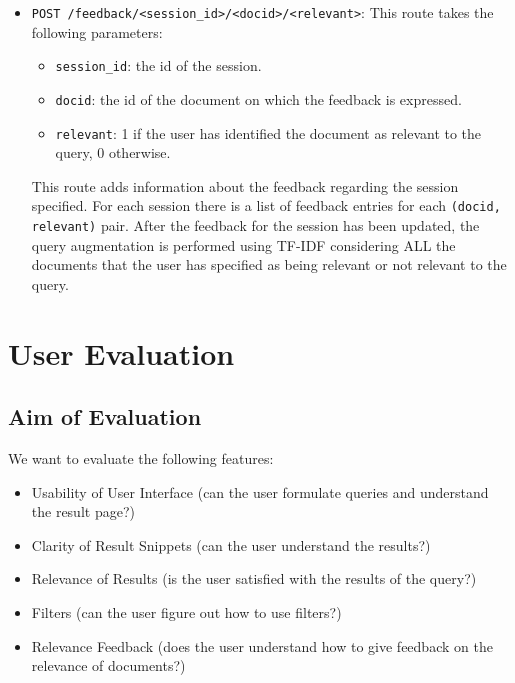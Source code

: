 \documentclass[unicode,9pt,a4paper,oneside,numbers=endperiod,openany]{scrartcl}
\begin{document}
\begin{itemize}
    \item \texttt{POST /feedback/<session\_id>/<docid>/<relevant>}:\newline
          This route takes the following parameters:
          \begin{itemize}
              \item \texttt{session\_id}: the id of the session.
              \item \texttt{docid}: the id of the document on which the feedback is expressed.
              \item \texttt{relevant}: 1 if the user has identified the document as relevant to the query, 0 otherwise.
          \end{itemize}
          This route adds information about the feedback regarding the session specified. For each session there is a list of feedback entries for each \texttt{(docid, relevant)} pair.
          After the feedback for the session has been updated, the query augmentation is performed using TF-IDF considering ALL the documents that the user has specified as being relevant or not relevant to the query.
\end{itemize}



\section{User Evaluation}

\subsection{Aim of Evaluation}

We want to evaluate the following features:

\begin{itemize}
    \item Usability of User Interface (can the user formulate queries and understand the result page?)
    \item Clarity of Result Snippets (can the user understand the results?)
    \item Relevance of Results (is the user satisfied with the results of the query?)
    \item Filters (can the user figure out how to use filters?)
    \item Relevance Feedback (does the user understand how to give feedback on the relevance of documents?)
\end{itemize}
\end{document}
